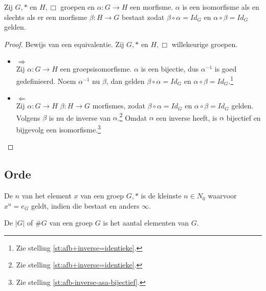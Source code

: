 \documentclass[main.tex]{subfiles}
\begin{document}
\begin{st}
  Zij $G,*$ en $H,\Box$ groepen en $\alpha: G \rightarrow H$ een morfisme.
  $\alpha$ is een isomorfisme als en slechts als er een morfisme $\beta: H \rightarrow G$ bestaat zodat $\beta \circ \alpha = Id_{G}$ en $\alpha \circ \beta = Id_{G}$ gelden.

  \begin{proof}
    Bewijs van een equivalentie.
    Zij $G,*$ en $H,\Box$ willekeurige groepen. 
    \begin{itemize}
    \item $\Rightarrow$\\
      Zij $\alpha: G \rightarrow H$ een groepsisomorfisme.
      $\alpha$ is een bijectie, dus $\alpha^{-1}$ is goed gedefinieerd.
      Noem $\alpha^{-1}$ nu $\beta$, dan gelden $\beta \circ \alpha = Id_{G}$ en $\alpha \circ \beta = Id_{G}$.\footnote{Zie stelling \ref{st:afb+inverse=identieke}.}
    \item $\Leftarrow$\\
      Zij $\alpha: G \rightarrow H$ $\beta: H \rightarrow G$ morfismes, zodat $\beta \circ \alpha = Id_{G}$ en $\alpha \circ \beta = Id_{G}$ gelden.
      Volgens $\beta$ is nu de inverse van $\alpha$.\footnote{Zie stelling \ref{st:afb+inverse=identieke}.}
      Omdat $\alpha$ een inverse heeft, is $\alpha$ bijectief en bijgevolg een isomorfisme.\footnote{Zie stelling \ref{st:afb-inverse-asa-bijectief}.}
    \end{itemize}
  \end{proof}
\end{st}


\subsection{Orde}
\label{sec:orde}

\begin{de}
  De  $n$ van het element $x$ van een groep $G,*$ is de kleinste $n \in N_{0}$ waarvoor $x^{n} = e_{G}$ geldt, indien die bestaat en anders $\infty$.
\end{de}

\begin{de}
  De  $|G|$ of $\#G$ van een groep $G$ is het aantal elementen van $G$.
\end{de}
\end{document}
